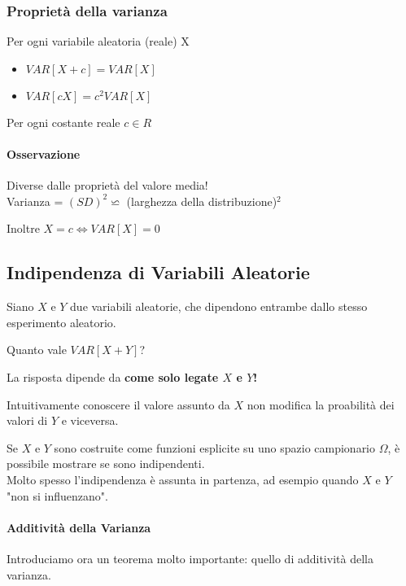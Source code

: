 \subsubsection{Proprietà della varianza}
Per ogni variabile aleatoria (reale) X
\begin{itemize}
	\item $VAR[X+c] = VAR[X]$
	\item $VAR[cX] = c^2 VAR[X]$
\end{itemize}
Per ogni costante reale $c \in R$
\paragraph{Osservazione} Diverse dalle proprietà del valore media!
\\ Varianza = $(SD)^2 \backsimeq $ (larghezza della distribuzione)$^2$
\begin{center}
	Inoltre $X = c \Leftrightarrow VAR[X] = 0$
\end{center}


\subsection{Indipendenza di Variabili Aleatorie}
Siano $X$ e $Y$ due variabili aleatorie, che dipendono entrambe dallo
stesso esperimento aleatorio.
\begin{center}
	Quanto vale $VAR[X+Y]$?
\end{center}
La risposta dipende da \textbf{come solo legate $X$ e $Y$!}

Intuitivamente conoscere il valore assunto da $X$ non modifica la proabilità dei valori
di $Y$ e viceversa.

Se $X$ e $Y$ sono costruite come funzioni esplicite su uno spazio campionario $\Omega$,
è possibile mostrare se sono indipendenti.
\\ Molto spesso l'indipendenza è assunta in partenza, ad esempio quando $X$ e $Y$ "non si influenzano".

\paragraph{Additività della Varianza}
Introduciamo ora un teorema molto importante: quello di additività della varianza.

